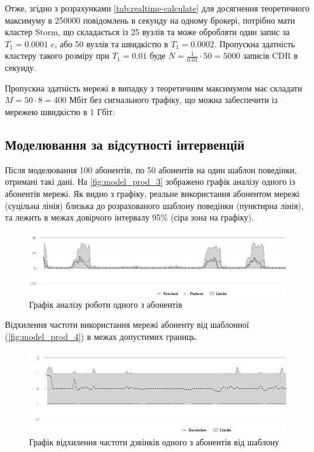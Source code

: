 Отже, згідно з розрахунками \autoref{tab:realtime-calculate} для досягнення теоретичного максимуму в 250000 повідомлень в секунду на одному брокері, потрібно мати кластер Storm, що складається із 25 вузлів та може обробляти один запис за $T_1 = 0.0001$ c, або 50 вузлів та швидкістю в $T_1 = 0.0002$. Пропускна здатність кластеру такого розміру при $T_1 = 0.01$ буде $N=\frac{1}{0.01} \cdot 50 = 5000$ записів CDR в секунду.

Пропускна здатність мережі в випадку з теоретичним максимумом має складати $M = 50 \cdot 8 = 400$ Мбіт без сигнального трафіку, що можна забеспечити із мережею швидкістю в 1 Гбіт.

\subsection{Моделювання за відсутності інтервенцій}

Після моделювання 100 абонентів, по 50 абонентів на один шаблон поведінки, отримані такі дані. На \autoref{fig:model_prod_3} зображено графік аналізу одного із абонентів мережі. Як видно з графіку, реальне використання абонентом мережі (суцільна лінія) близька до розрахованого шаблону поведінки (пунктирна лінія), та лежить в межах довірчого інтервалу 95\% (сіра зона на графіку).

\begin{figure}[h!]
        \begin{center}
            \includegraphics[scale=0.55]{resources/model_2_3.png}
        \end{center}
        \caption{Графік аналізу роботи одного з абонентів}
        \label{fig:model_prod_3}
\end{figure}

Відхилення частоти використання мережі абоненту від шаблонної (\autoref{fig:model_prod_4}) в межах допустимих границь.

\begin{figure}[h!]
        \begin{center}
            \includegraphics[scale=0.55]{resources/model_2_4.png}
        \end{center}
        \caption{Графік відхилення частоти дзвінків одного з абонентів від шаблону}
        \label{fig:model_prod_4}
\end{figure}

